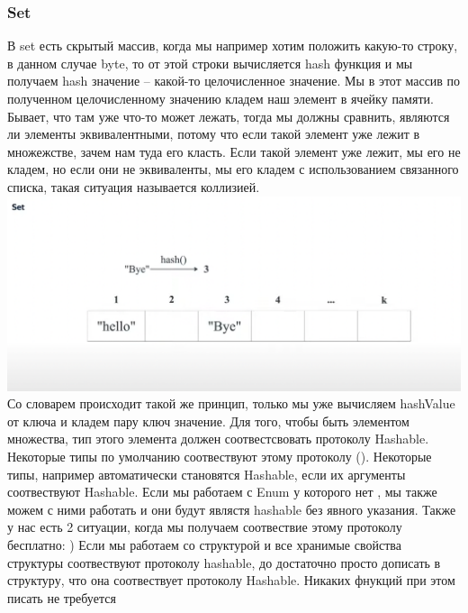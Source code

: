 \documentclass{article}
\begin{document}
    \subsubsection{Set}
    В set есть скрытый массив, когда мы например хотим положить какую-то строку, в данном случае byte, то от этой строки вычисляется hash функция и мы получаем hash значение -- какой-то целочисленное значение. Мы в этот массив по полученном целочисленному значению кладем наш элемент в ячейку памяти. Бывает, что там уже что-то может лежать, тогда мы должны сравнить, являются ли элементы эквивалентными, потому что если такой элемент уже лежит в множежстве, зачем нам туда его класть. Если такой элемент уже лежит, мы его не кладем, но если они не эквиваленты, мы его кладем с использованием связанного списка, такая ситуация называется коллизией. 
    \newline
    \includegraphics[scale = 0.5]{pic/Снимок экрана 2023-07-29 в 00.15.13.png}
    \newline
    Со словарем происходит такой же принцип, только мы уже вычисляем hashValue от ключа и кладем пару ключ значение. 
    \newline
    Для того, чтобы быть элементом множества, тип этого элемента должен соотвестсвовать протоколу Hashable. Некоторые типы по умолчанию соотвествуют этому протоколу (). Некоторые типы, например  автоматически становятся Hashable, если их аргументы соотвествуют Hashable. Если мы работаем с Enum у которого нет , мы также можем с ними работать и они будут являстя hashable без явного указания. Также у нас есть 2 ситуации, когда мы получаем соотвествие этому протоколу бесплатно: 
    ) Если мы работаем со структурой и все хранимые свойства структуры соотвествуют протоколу hashable, до достаточно просто дописать в структуру, что она соотвествует протоколу Hashable. Никаких фнукций при этом писать не требуется
\end{document}

